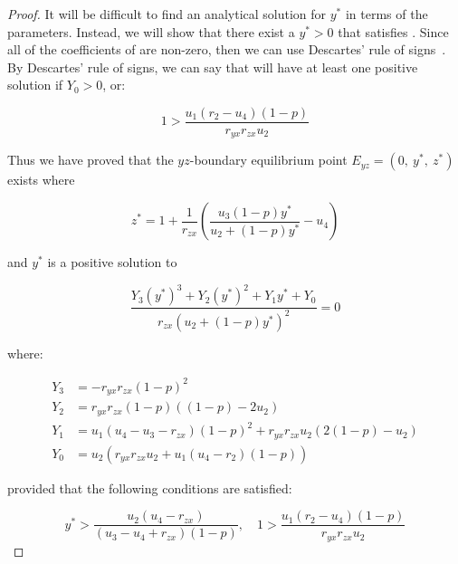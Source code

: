\begin{proof}
    It will be difficult to find an analytical solution for $y^*$ in terms of the parameters. Instead, we will show that there exist a $y^*>0$ that satisfies . Since all of the coefficients of  are non-zero, then we can use Descartes' rule of signs~\cite{WANG2004525526}. By Descartes' rule of signs, we can say that  will have at least one positive solution if $Y_0>0$, or:
    
    \begin{equation*}
        1 > \frac{u_1\left(r_2-u_4\right)\left(1-p\right)}{r_{yx}r_{zx}u_2}
    \end{equation*}

    Thus we have proved that the $yz$-boundary equilibrium point $E_{yz}=\left(0,\ y^*,\ z^*\right)$ exists where
    
    \begin{equation*}
        z^*=1+\frac{1}{r_{zx}}\left(\frac{u_3\left(1-p\right)y^*}{u_2+\left(1-p\right)y^*}-u_4\right)
    \end{equation*}

    and $y^*$ is a positive solution to 

    \begin{equation*}
        \frac{Y_3\left(y^*\right)^3+Y_2\left(y^*\right)^2+Y_1y^*+Y_0}{r_{zx}\left(u_2+\left(1-p\right)y^*\right)^2}=0
    \end{equation*}

    where:

    \begin{align*}
        Y_3 &= -r_{yx}r_{zx}\left(1-p\right)^2\\
        Y_2 &= r_{yx}r_{zx}\left(1-p\right)\left(\left(1-p\right)-2u_2\right)\\
        Y_1 &= u_1\left(u_4-u_3-r_{zx}\right)\left(1-p\right)^2+r_{yx}r_{zx}u_2\left(2\left(1-p\right)-u_2\right)\\
        Y_0 &= u_2\left(r_{yx}r_{zx}u_2+u_1\left(u_4-r_2\right)\left(1-p\right)\right)
    \end{align*}

    provided that the following conditions are satisfied:
    
    \begin{equation*}
        y^* > \frac{u_2\left(u_4-r_{zx}\right)}{\left(u_3-u_4+r_{zx}\right)\left(1-p\right)},\quad 
        1 > \frac{u_1\left(r_2-u_4\right)\left(1-p\right)}{r_{yx}r_{zx}u_2}
    \end{equation*}
\end{proof}

